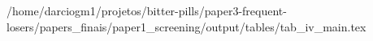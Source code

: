 /home/darciogm1/projetos/bitter-pills/paper3-frequent-losers/papers_finais/paper1_screening/output/tables/tab_iv_main.tex